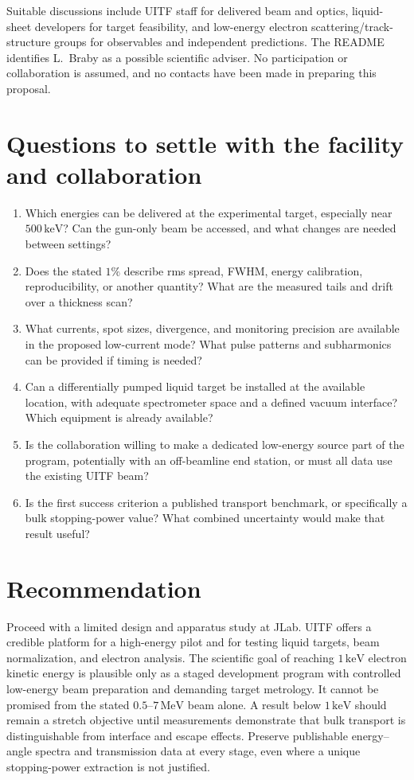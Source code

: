 \documentclass[11pt,letterpaper]{article}
\newcommand{\keV}{\,\mathrm{keV}}
\newcommand{\MeV}{\,\mathrm{MeV}}
\begin{document}
Suitable discussions include UITF staff for delivered beam and optics, liquid-sheet developers for
target feasibility, and low-energy electron scattering/track-structure groups for observables and
independent predictions. The README identifies L.\ Braby as a possible scientific adviser. No
participation or collaboration is assumed, and no contacts have been made in preparing this proposal.

\section{Questions to settle with the facility and collaboration}

\begin{enumerate}
  \item Which energies can be delivered at the experimental target, especially near $500\keV$?
    Can the gun-only beam be accessed, and what changes are needed between settings?
  \item Does the stated $1\%$ describe rms spread, FWHM, energy calibration, reproducibility, or
    another quantity? What are the measured tails and drift over a thickness scan?
  \item What currents, spot sizes, divergence, and monitoring precision are available in the proposed
    low-current mode? What pulse patterns and subharmonics can be provided if timing is needed?
  \item Can a differentially pumped liquid target be installed at the available location, with adequate
    spectrometer space and a defined vacuum interface? Which equipment is already available?
  \item Is the collaboration willing to make a dedicated low-energy source part of the program,
    potentially with an off-beamline end station, or must all data use the existing UITF beam?
  \item Is the first success criterion a published transport benchmark, or specifically a bulk
    stopping-power value? What combined uncertainty would make that result useful?
\end{enumerate}

\section{Recommendation}

Proceed with a limited design and apparatus study at JLab. UITF offers a credible platform for a
high-energy pilot and for testing liquid targets, beam normalization, and electron analysis. The
scientific goal of reaching $1\keV$ electron kinetic energy is plausible only as a staged development
program with controlled low-energy beam preparation and demanding target metrology. It cannot be
promised from the stated $0.5$--$7\MeV$ beam alone. A result below $1\keV$ should remain a stretch
objective until measurements demonstrate that bulk transport is distinguishable from interface and
escape effects. Preserve publishable energy--angle spectra and transmission data at every stage,
even where a unique stopping-power extraction is not justified.
\end{document}
